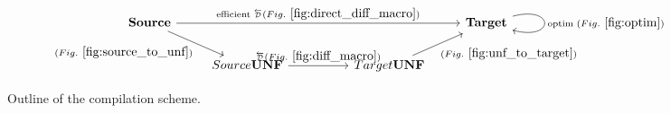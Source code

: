 \begin{figure}
\[
\begin{tikzcd}
    \Source \ar[rrrr,"\text{efficient }\Dsynrevsymbol (Fig.~\ref{fig:direct_diff_macro})"] \ar[dr,"(Fig.~\ref{fig:source_to_unf})"'] &&&& \Target \arrow[r,loop right,"\text{optim }(Fig.~\ref{fig:optim})"] \\
    & Source\UNFSymbol \ar[rr,"\Dsynrevsymbol (Fig.~\ref{fig:diff_macro})"] && Target\UNFSymbol \ar[ur,"(Fig.~\ref{fig:unf_to_target})"'] & 
\end{tikzcd}
\]
\caption{Outline of the compilation scheme.}
\label{fig:outline}
\end{figure}